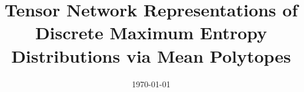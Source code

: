 \documentclass[aps,onecolumn,nofootinbib,pra]{article}
\begin{document}
    \title{Tensor Network Representations of Discrete Maximum Entropy Distributions via Mean Polytopes}

    \maketitle
    \date{\today}

    \begin{abstract}
        
    \end{abstract}

    \tableofcontents

    

    

    

    

    

    

    
    
\end{document}
